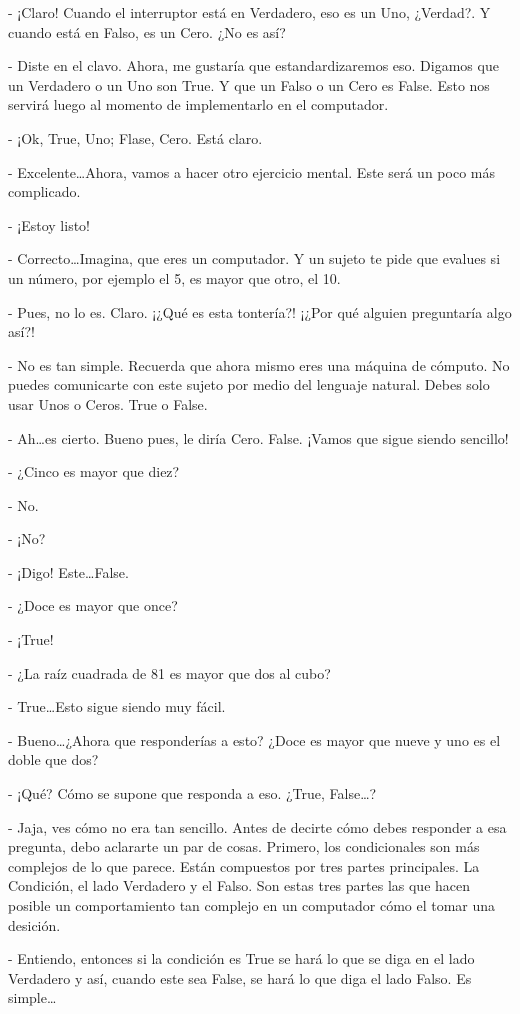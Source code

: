 \documentclass[12pt, letterpaper]{article}
\begin{document}
- ¡Claro! Cuando el interruptor está en Verdadero, eso es un Uno, ¿Verdad?. Y cuando está en Falso, es un Cero. ¿No es así?

- Diste en el clavo. Ahora, me gustaría que estandardizaremos eso. Digamos que un Verdadero o un Uno son True. Y que un Falso o un Cero es False.
Esto nos servirá luego al momento de implementarlo en el computador.

- ¡Ok, True, Uno; Flase, Cero. Está claro.

- Excelente\dots Ahora, vamos a hacer otro ejercicio mental. Este será un poco más complicado. 

- ¡Estoy listo!

- Correcto\dots Imagina, que eres un computador. Y un sujeto te pide que evalues si un número, por ejemplo el 5, es mayor que otro, el 10.

- Pues, no lo es. Claro. ¡¿Qué es esta tontería?! ¡¿Por qué alguien preguntaría algo así?!

- No es tan simple. Recuerda que ahora mismo eres una máquina de cómputo. No puedes comunicarte con este sujeto por medio del lenguaje natural.
Debes solo usar Unos o Ceros. True o False. 

- Ah\dots es cierto. Bueno pues, le diría Cero. False. ¡Vamos que sigue siendo sencillo! 

- ¿Cinco es mayor que diez?

- No. 

- ¡No?

- ¡Digo! Este\dots False.

- ¿Doce es mayor que once?

- ¡True!

- ¿La raíz cuadrada de 81 es mayor que dos al cubo?

- True\dots Esto sigue siendo muy fácil. 

- Bueno\dots ¿Ahora que responderías a esto? ¿Doce es mayor que nueve y uno es el doble que dos?

- ¡Qué? Cómo se supone que responda a eso. ¿True, False\dots?

- Jaja, ves cómo no era tan sencillo. Antes de decirte cómo debes responder a esa pregunta, debo aclararte un par de cosas. Primero, los condicionales
son más complejos de lo que parece. Están compuestos por tres partes principales. La Condición, el lado Verdadero y el Falso. Son estas tres partes
las que hacen posible un comportamiento tan complejo en un computador cómo el tomar una desición.

- Entiendo, entonces si la condición es True se hará lo que se diga en el lado Verdadero y así, cuando este sea False, se hará lo que diga el lado
Falso. Es simple\dots
\end{document}
